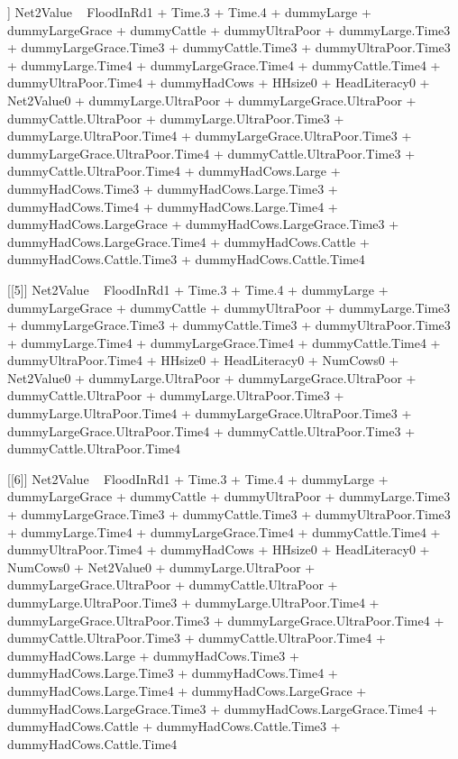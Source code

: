 \begin{Schunk}
\begin{Soutput}
[[4]]
Net2Value ~ FloodInRd1 + Time.3 + Time.4 + dummyLarge + dummyLargeGrace + 
    dummyCattle + dummyUltraPoor + dummyLarge.Time3 + dummyLargeGrace.Time3 + 
    dummyCattle.Time3 + dummyUltraPoor.Time3 + dummyLarge.Time4 + 
    dummyLargeGrace.Time4 + dummyCattle.Time4 + dummyUltraPoor.Time4 + 
    dummyHadCows + HHsize0 + HeadLiteracy0 + Net2Value0 + dummyLarge.UltraPoor + 
    dummyLargeGrace.UltraPoor + dummyCattle.UltraPoor + dummyLarge.UltraPoor.Time3 + 
    dummyLarge.UltraPoor.Time4 + dummyLargeGrace.UltraPoor.Time3 + 
    dummyLargeGrace.UltraPoor.Time4 + dummyCattle.UltraPoor.Time3 + 
    dummyCattle.UltraPoor.Time4 + dummyHadCows.Large + dummyHadCows.Time3 + 
    dummyHadCows.Large.Time3 + dummyHadCows.Time4 + dummyHadCows.Large.Time4 + 
    dummyHadCows.LargeGrace + dummyHadCows.LargeGrace.Time3 + 
    dummyHadCows.LargeGrace.Time4 + dummyHadCows.Cattle + dummyHadCows.Cattle.Time3 + 
    dummyHadCows.Cattle.Time4

[[5]]
Net2Value ~ FloodInRd1 + Time.3 + Time.4 + dummyLarge + dummyLargeGrace + 
    dummyCattle + dummyUltraPoor + dummyLarge.Time3 + dummyLargeGrace.Time3 + 
    dummyCattle.Time3 + dummyUltraPoor.Time3 + dummyLarge.Time4 + 
    dummyLargeGrace.Time4 + dummyCattle.Time4 + dummyUltraPoor.Time4 + 
    HHsize0 + HeadLiteracy0 + NumCows0 + Net2Value0 + dummyLarge.UltraPoor + 
    dummyLargeGrace.UltraPoor + dummyCattle.UltraPoor + dummyLarge.UltraPoor.Time3 + 
    dummyLarge.UltraPoor.Time4 + dummyLargeGrace.UltraPoor.Time3 + 
    dummyLargeGrace.UltraPoor.Time4 + dummyCattle.UltraPoor.Time3 + 
    dummyCattle.UltraPoor.Time4

[[6]]
Net2Value ~ FloodInRd1 + Time.3 + Time.4 + dummyLarge + dummyLargeGrace + 
    dummyCattle + dummyUltraPoor + dummyLarge.Time3 + dummyLargeGrace.Time3 + 
    dummyCattle.Time3 + dummyUltraPoor.Time3 + dummyLarge.Time4 + 
    dummyLargeGrace.Time4 + dummyCattle.Time4 + dummyUltraPoor.Time4 + 
    dummyHadCows + HHsize0 + HeadLiteracy0 + NumCows0 + Net2Value0 + 
    dummyLarge.UltraPoor + dummyLargeGrace.UltraPoor + dummyCattle.UltraPoor + 
    dummyLarge.UltraPoor.Time3 + dummyLarge.UltraPoor.Time4 + 
    dummyLargeGrace.UltraPoor.Time3 + dummyLargeGrace.UltraPoor.Time4 + 
    dummyCattle.UltraPoor.Time3 + dummyCattle.UltraPoor.Time4 + 
    dummyHadCows.Large + dummyHadCows.Time3 + dummyHadCows.Large.Time3 + 
    dummyHadCows.Time4 + dummyHadCows.Large.Time4 + dummyHadCows.LargeGrace + 
    dummyHadCows.LargeGrace.Time3 + dummyHadCows.LargeGrace.Time4 + 
    dummyHadCows.Cattle + dummyHadCows.Cattle.Time3 + dummyHadCows.Cattle.Time4


\end{Soutput}
\end{Schunk}
